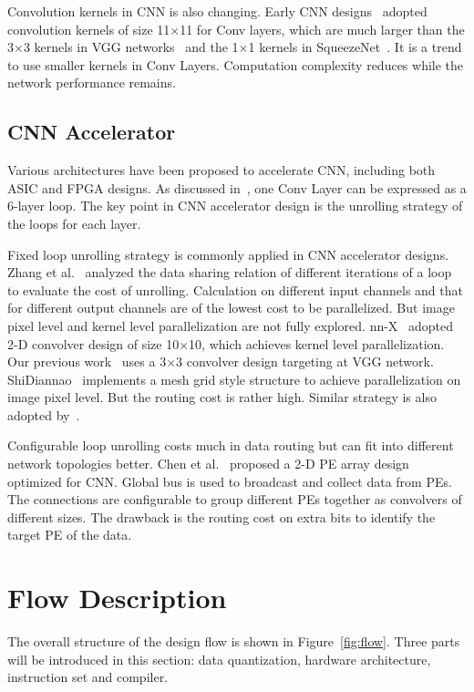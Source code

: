 \documentclass[10pt, conference, compsocconf]{IEEEtran}
\begin{document}
Convolution kernels in CNN is also changing. Early CNN designs~\cite{krizhevsky2012imagenet}\cite{zeiler2014visualizing} adopted convolution kernels of size 11$\times$11 for Conv layers, which are much larger than the 3$\times$3 kernels in VGG networks~\cite{simonyan2014very} and the 1$\times$1 kernels in SqueezeNet~\cite{iandola2016squeezenet}.  It is a trend to use smaller kernels in Conv Layers. Computation complexity reduces while the network performance remains.

\subsection{CNN Accelerator}
Various architectures have been proposed to accelerate CNN, including both ASIC and FPGA designs. As discussed in~\cite{zhang2015optimizing}, one Conv Layer can be expressed as a 6-layer loop. The key point in CNN accelerator design is the unrolling strategy of the loops for each layer.

Fixed loop unrolling strategy is commonly applied in CNN accelerator designs. Zhang et al.~\cite{zhang2015optimizing} analyzed the data sharing relation of different iterations of a loop to evaluate the cost of unrolling. Calculation on different input channels and that for different output channels are of the lowest cost to be parallelized. But image pixel level and kernel level parallelization are not fully explored. nn-X~\cite{gokhale2014240} adopted 2-D convolver design of size 10$\times$10, which achieves kernel level parallelization. Our previous work~\cite{qiu2016going} uses a 3$\times$3 convolver design targeting at VGG network. ShiDiannao~\cite{du2015shidiannao} implements a mesh grid style structure to achieve parallelization on image pixel level. But the routing cost is rather high. Similar strategy is also adopted by~\cite{sim2016deep}.

Configurable loop unrolling costs much in data routing but can fit into different network topologies better. Chen et al.~\cite{chen2016eyeriss} proposed a 2-D PE array design optimized for CNN. Global bus is used to broadcast and collect data from PEs. The connections are configurable to group different PEs together as convolvers of different sizes. The drawback is the routing cost on extra bits to identify the target PE of the data.


\section{Flow Description}\label{sec:flow}
The overall structure of the design flow is shown in Figure~\ref{fig:flow}. Three parts will be introduced in this section: data quantization, hardware architecture, instruction set and compiler.
\end{document}
